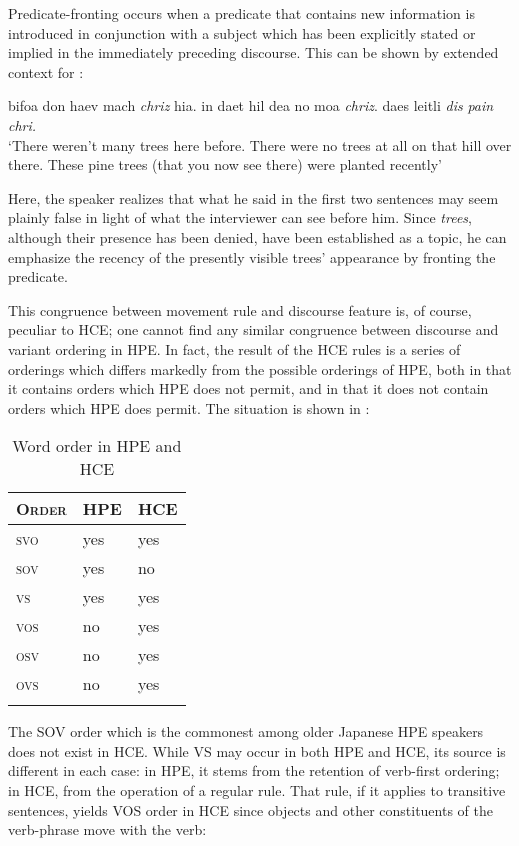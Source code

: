 Predicate-fronting occurs when a predicate that contains new information is introduced in conjunction with a subject which has been explicitly stated or implied in the immediately preceding discourse. This can be shown by extended context for :

\ea\label{ex:26}
 bifoa don haev mach \textit{chriz} hia. in daet hil dea no moa \textit{chriz}. daes leitli \textit{dis} \textit{pain} \textit{chri.} \\
\glt  `There weren't many trees here before. There were no trees
at all on that hill over there. These pine trees (that you now see there) were planted recently'
\z

\noindent Here, the speaker realizes that what he said in the first two sentences may seem plainly false in light of what the interviewer can see before him. Since \textit{trees}, although their presence has been denied, have been established as a topic, he can emphasize the recency of the presently visible trees' appearance by fronting the predicate.

This congruence between movement rule and discourse feature is, of course, peculiar to HCE; one cannot find any similar congruence between discourse and variant ordering in HPE. In fact, the result of the HCE rules is a series of orderings which differs markedly from the possible orderings of HPE, both in that it contains orders which HPE does not permit, and in that it does not contain orders which HPE does permit. The situation is shown in :


\begin{table}
\begin{tabular}{>{\scshape}lll}
\lsptoprule
\rm Order & HPE & HCE\\
\midrule
svo  & yes &  yes\\
sov  & yes  &  no\\
vs  & yes  & yes\\
vos  & no & yes\\
osv  & no &  yes\\
ovs  & no &  yes\\
\lspbottomrule
\end{tabular}
\caption{Word order in HPE and HCE}
\label{tab:1.1}
\end{table}

The SOV order which is the commonest among older Japanese HPE speakers does not exist in HCE. While VS may occur in both HPE and HCE, its source is different in each case: in HPE, it stems from the retention of verb-first ordering; in HCE, from the operation of a regular rule. That rule, if it applies to transitive sentences, yields VOS order in HCE since objects and other constituents of the verb-phrase move
with the verb:

